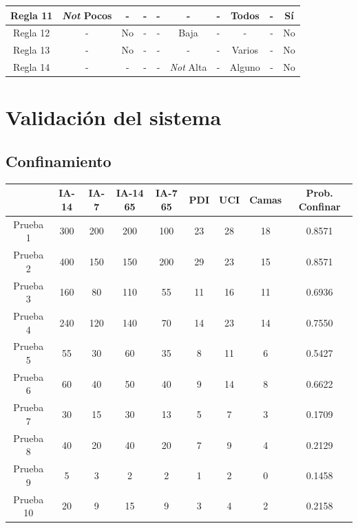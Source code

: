 \documentclass[12pt,a4paper, xcolor=table]{article}
\begin{document}
\begin{center}
\begin{adjustwidth}{-1.3cm}{}
\begin{tabular}{c|c|c|c|c|c|c|c|c|c|}
\multicolumn{1}{|c|}{Regla 11} & \textit{Not} Pocos & - & - & - & - & - & Todos & - & Sí \\ \hline
\multicolumn{1}{|c|}{Regla 12} & - & No & - & - & Baja & - & - & - & No \\ \hline
\multicolumn{1}{|c|}{Regla 13} & - & No & - & - & - & - & Varios & - & No \\ \hline
\multicolumn{1}{|c|}{Regla 14} & - & - & - & - & \textit{Not} Alta & - & Alguno & - & No \\ \hline
\end{tabular}
\end{adjustwidth}
\end{center}





\section{Validación del sistema}

  \subsection{Confinamiento}
    \begin{center}
      \hspace{-13mm}
    \begin{tabular}{c|c|c|c|c|c|c|c|c|}
      \cline{2-9}
                                    & IA-14 & IA-7 & IA-14 65 & IA-7 65 & PDI & UCI & Camas & \textbf{Prob. Confinar} \\ \hline
    \multicolumn{1}{|c|}{Prueba 1} & 300 & 200 & 200 & 100 & 23 & 28 & 18 & 0.8571 \\ \hline
    \multicolumn{1}{|c|}{Prueba 2} & 400 & 150 & 150 & 200 & 29 & 23 & 15 & 0.8571 \\ \hline
    \multicolumn{1}{|c|}{Prueba 3} & 160 & 80 & 110 & 55 & 11 & 16 & 11 & 0.6936 \\ \hline
    \multicolumn{1}{|c|}{Prueba 4} & 240 & 120 & 140 & 70 & 14 & 23 & 14 & 0.7550 \\ \hline
    \multicolumn{1}{|c|}{Prueba 5} & 55 & 30 & 60 & 35 & 8 & 11 & 6 & 0.5427 \\ \hline
    \multicolumn{1}{|c|}{Prueba 6} & 60 & 40 & 50 & 40 & 9 & 14 & 8 & 0.6622 \\ \hline
    \multicolumn{1}{|c|}{Prueba 7} & 30 & 15 & 30 & 13 & 5 & 7 & 3 & 0.1709 \\ \hline
    \multicolumn{1}{|c|}{Prueba 8} & 40 & 20 & 40 & 20 & 7 & 9 & 4 & 0.2129 \\ \hline
    \multicolumn{1}{|c|}{Prueba 9} & 5 & 3 & 2 & 2 & 1 & 2 & 0 & 0.1458 \\ \hline
    \multicolumn{1}{|c|}{Prueba 10} & 20 & 9 & 15 & 9 & 3 & 4 & 2 & 0.2158 \\ \hline
    \end{tabular}
    \end{center}
\end{document}
